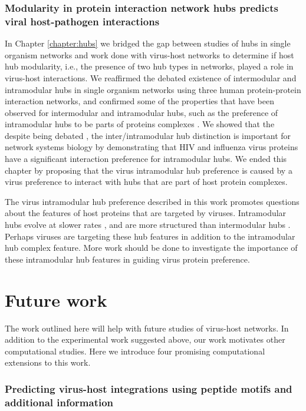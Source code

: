 \subsubsection{Modularity in protein interaction network hubs predicts viral host-pathogen interactions}

In Chapter \ref{chapter:hubs} we bridged the gap between studies of
hubs in single organism networks and work done with virus-host
networks to determine if host hub modularity, i.e., the presence of
two hub types in networks, played a role in virus-host
interactions. We reaffirmed the debated existence of intermodular and
intramodular hubs in single organism networks using three human
protein-protein interaction networks, and confirmed some of the
properties that have been observed for intermodular and intramodular
hubs, such as the preference of intramodular hubs to be parts of
proteins complexes \cite{fraser05}. We showed that the despite being
debated \cite{taylor09,batada06,batada07,agarwal09,han04}, the
inter/intramodular hub distinction is important for network systems
biology by demonstrating that HIV and influenza virus proteins have a
significant interaction preference for intramodular hubs. We ended
this chapter by proposing that the virus intramodular hub preference
is caused by a virus preference to interact with hubs that are part of
host protein complexes.

The virus intramodular hub preference described in this work promotes
questions about the features of host proteins that are targeted by
viruses. Intramodular hubs evolve at slower rates
\cite{fraser2005modularity}, and are more structured than intermodular
hubs
\cite{ekman2006properties,singh2007role,tokuriki2009viral}. Perhaps
viruses are targeting these hub features in addition to the
intramodular hub complex feature. More work should be done to
investigate the importance of these intramodular hub features in
guiding virus protein preference.

\section{Future work}
The work outlined here will help with future studies of virus-host
networks. In addition to the experimental work suggested above, our
work motivates other computational studies. Here we introduce four
promising computational extensions to this work.

\subsubsection{Predicting virus-host integrations using peptide motifs and additional information}

